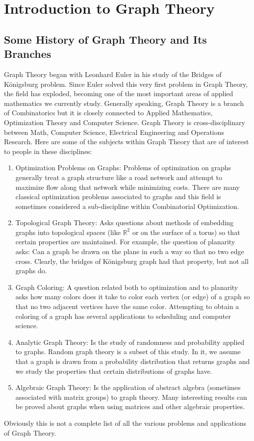\section{ Introduction to Graph Theory}

\subsection{ Some History of Graph Theory and Its Branches}
Graph Theory began with Leonhard Euler in his study of the Bridges of Königsburg problem.
Since Euler solved this very first problem in Graph Theory, the field has exploded, becoming one of the most important areas of applied mathematics we currently study.
Generally speaking, Graph Theory is a branch of Combinatorics but it is closely connected to Applied Mathematics, Optimization Theory and Computer Science.
Graph Theory is cross-disciplinary between Math, Computer Science, Electrical Engineering and Operations Research.
%
Here are some of the subjects within Graph Theory that are of interest to people in these disciplines:
\begin{enumerate}
\item Optimization Problems on Graphs: Problems of optimization on graphs generally treat a graph structure like a road network and attempt to maximize flow along that network while minimizing costs.
There are many classical optimization problems associated to graphs and this field is sometimes considered a sub-discipline within Combinatorial Optimization.
\item Topological Graph Theory: Asks questions about methods of embedding graphs into topological spaces (like \(\mathbb{R}^2\) or on the surface of a torus) so that certain properties are maintained.
For example, the question of planarity asks:
Can a graph be drawn on the plane in such a way so that no two edge cross.
Clearly, the bridges of Königsburg graph had that property, but not all graphs do.
\item Graph Coloring: A question related both to optimization and to planarity asks how many colors does it take to color each vertex (or edge) of a graph so that no two adjacent vertices have the same color.
Attempting to obtain a coloring of a graph has several applications to scheduling and computer science.
\item Analytic Graph Theory: Is the study of randomness and probability applied to graphs.
Random graph theory is a subset of this study.
In it, we assume that a graph is drawn from a probability distribution that returns graphs and we study the properties that certain distributions of graphs have.
\item Algebraic Graph Theory: Is the application of abstract algebra (sometimes associated with matrix groups) to graph theory.
Many interesting results can be proved about graphs when using matrices and other algebraic properties.
\end{enumerate}
%
Obviously this is not a complete list of all the various problems and applications of Graph Theory.

